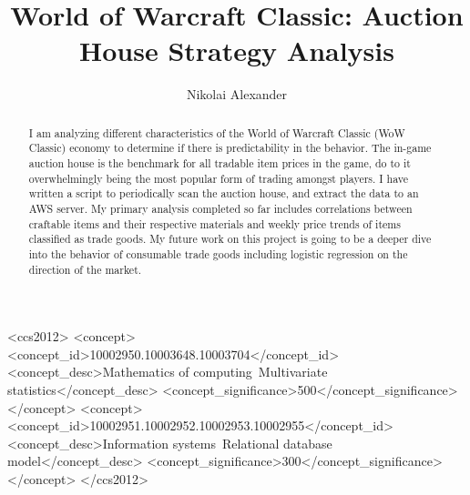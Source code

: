 \documentclass[sigconf]{acmart}
\begin{document}
%
\title{World of Warcraft Classic: Auction House Strategy Analysis}

%
\author{Nikolai Alexander}

%
\renewcommand{\shortauthors}{Alexander}

%
\begin{abstract}
I am analyzing different characteristics of the World of Warcraft Classic (WoW Classic) economy to determine if there is predictability in the behavior. The in-game auction house is the benchmark for all tradable item prices in the game, do to it overwhelmingly being the most popular form of trading amongst players. I have written a script to periodically scan the auction house, and extract the data to an AWS server. My primary analysis completed so far includes correlations between craftable items and their respective materials and weekly price trends of items classified as trade goods. My future work on this project is going to be a deeper dive into the behavior of consumable trade goods including logistic regression on the direction of the market.
\end{abstract}

%
%
\begin{CCSXML}
<ccs2012>
<concept>
<concept_id>10002950.10003648.10003704</concept_id>
<concept_desc>Mathematics of computing~Multivariate statistics</concept_desc>
<concept_significance>500</concept_significance>
</concept>
<concept>
<concept_id>10002951.10002952.10002953.10002955</concept_id>
<concept_desc>Information systems~Relational database model</concept_desc>
<concept_significance>300</concept_significance>
</concept>
</ccs2012>
\end{CCSXML}
\end{document}
